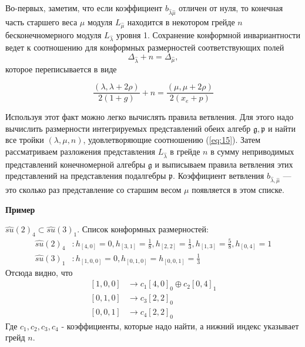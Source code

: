 \documentclass[a4paper,12pt]{article}
\theoremstyle{definition} \newtheorem{Def}{Definition}
\begin{document}
Во-первых, заметим, что если коэффициент $b_{\hat\lambda\hat\mu}$ отличен от нуля, то конечная часть старшего веса $\mu$ модуля $L_{\hat\mu}$ находится в некотором грейде $n$  бесконечномерного модуля $L_{\hat\lambda}$ уровня 1. Сохранение конформной инвариантности ведет к соотношению для конформных размерностей соответствующих полей
\begin{equation}
  \label{eq:14}
  \Delta_{\hat\lambda}+n=\Delta_{\hat\mu},
\end{equation}
которое переписывается в виде

\begin{equation}
  \label{eq:15}
  \frac{(\lambda,\lambda+2\rho)}{2(1+g)}+n=\frac{(\mu,\mu+2\rho)}{2(x_e+p)}
\end{equation}

Используя этот факт можно  легко вычислять правила ветвления. Для этого надо вычислить размерности интегрируемых представлений обеих алгебр  $\mathfrak{g},\mathfrak{p}$ и найти все тройки  $(\lambda,\mu,n)$, удовлетворяющие соотношению (\ref{eq:15}). Затем рассматриваем разложения представления $L_{\hat\lambda}$ в грейде $n$ в сумму неприводимых представлений конечномерной алгебры $\mathfrak{g}$ и выписываем правила ветвления этих представлений на представления подалгебры $\mathfrak{p}$. Коэффициент ветвления $b_{\hat{\lambda},\hat{\mu}}$ --- это сколько раз представление со старшим весом $\mu$ появляется в этом списке.

{\bf Пример}

$\hat{su}(2)_4\subset \hat{su}(3)_1$.
Список конформных размерностей:
\begin{equation}
  \label{eq:16}
  \begin{aligned}
    \hat{su}(2)_4&: h_{[4,0]}=0, h_{[3,1]}=\frac{1}{8}, h_{[2,2]}=\frac{1}{3}, h_{[1,3]}=\frac{5}{8}, h_{[0,4]}=1\\
    \hat{su}(3)_1&: h_{[1,0,0]}=0, h_{[0,1,0]}=h_{[0,0,1]}=\frac{1}{3}    
  \end{aligned}
\end{equation}
Отсюда видно, что
\begin{equation}
  \label{eq:17}
  \begin{aligned}
    \left[1,0,0\right] &\to c_1 [4,0]_0\oplus c_2 [0,4]_1\\
    [0,1,0] &\to c_3 [2,2]_0\\
    [0,0,1] &\to c_4 [2,2]_0
  \end{aligned}
\end{equation}
Где $c_1, c_2, c_3, c_4$ - коэффициенты, которые надо найти, а нижний индекс указывает грейд $n$.
\end{document}
